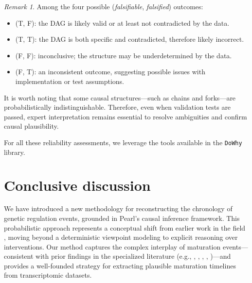 \documentclass[
]{article}
\theoremstyle{definition}
\theoremstyle{remark}
\newtheorem{refremark}{Remark}[section]
\begin{document}
\begin{refremark}
Among the four possible (\emph{falsifiable}, \emph{falsified}) outcomes:

\begin{itemize}
\item
  (T, F): the DAG is likely valid or at least not contradicted by the
  data.
\item
  (T, T): the DAG is both specific and contradicted, therefore likely
  incorrect.
\item
  (F, F): inconclusive; the structure may be underdetermined by the
  data.
\item
  (F, T): an inconsistent outcome, suggesting possible issues with
  implementation or test assumptions.
\end{itemize}

It is worth noting that some causal structures---such as chains and
forks---are probabilistically indistinguishable. Therefore, even when
validation tests are passed, expert interpretation remains essential to
resolve ambiguities and confirm causal plausibility.

For all these reliability assessments, we leverage the tools available
in the \texttt{DoWhy} library.

\label{rem-falsification}

\end{refremark}

\section{Conclusive discussion}\label{sec-discussion}

We have introduced a new methodology for reconstructing the chronology
of genetic regulation events, grounded in Pearl's causal inference
framework. This probabilistic approach represents a conceptual shift
from earlier work in the field
, moving beyond a
deterministic viewpoint modeling to explicit reasoning over
interventions. Our method captures the complex interplay of maturation
events---consistent with prior findings in the specialized literature
(e.g., ,
,
,
,
)---and
provides a well-founded strategy for extracting plausible maturation
timelines from transcriptomic datasets.
\end{document}
